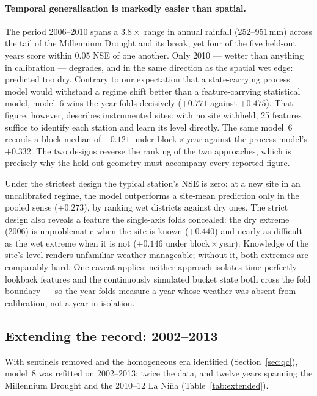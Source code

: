 \documentclass[11pt,a4paper]{article}
\begin{document}
\paragraph{Temporal generalisation is markedly easier than spatial.} The
period 2006--2010 spans a $3.8\times$ range in annual rainfall (252--951\,mm)
across the tail of the Millennium Drought and its break, yet four of the five
held-out years score within 0.05 NSE of one another. Only 2010 --- wetter than
anything in calibration --- degrades, and in the same direction as the spatial
wet edge: predicted too dry. Contrary to our expectation that a state-carrying
process model would withstand a regime shift better than a feature-carrying
statistical model, model~6 wins the year folds decisively ($+0.771$ against
$+0.475$). That figure, however, describes instrumented sites: with no site
withheld, 25 features suffice to identify each station and learn its level
directly. The same model~6 records a block-median of $+0.121$ under
block\,$\times$\,year against the process model's $+0.332$. The two designs
reverse the ranking of the two approaches, which is precisely why the hold-out
geometry must accompany every reported figure.

Under the strictest design the typical station's NSE is zero: at a new site in
an uncalibrated regime, the model outperforms a site-mean prediction only in
the pooled sense ($+0.273$), by ranking wet districts against dry ones. The
strict design also reveals a feature the single-axis folds concealed: the dry
extreme (2006) is unproblematic when the site is known ($+0.440$) and nearly
as difficult as the wet extreme when it is not ($+0.146$ under
block\,$\times$\,year). Knowledge of the site's level renders unfamiliar
weather manageable; without it, both extremes are comparably hard. One caveat
applies: neither approach isolates time perfectly --- lookback features and
the continuously simulated bucket state both cross the fold boundary --- so
the year folds measure a year whose weather was absent from calibration, not a
year in isolation.

\subsection{Extending the record: 2002--2013}\label{sec:extended}

With sentinels removed and the homogeneous era identified
(Section~\ref{sec:qc}), model~8 was refitted on 2002--2013: twice the data,
and twelve years spanning the Millennium Drought and the 2010--12 La Ni\~na
(Table~\ref{tab:extended}).
\end{document}
